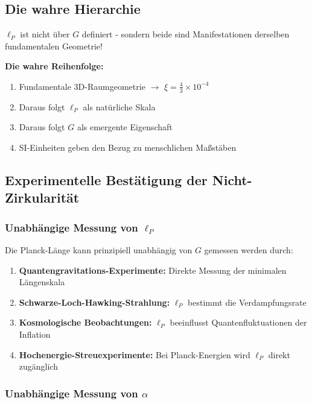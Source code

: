 \documentclass[12pt,a4paper]{article}
\theoremstyle{definition}
\begin{document}
	\subsection{Die wahre Hierarchie}
	
	\begin{tcolorbox}[colback=green!5!white,colframe=green!75!black,title=Korrekte Interpretation]
		$\ell_P$ ist nicht \"uber $G$ definiert - sondern beide sind Manifestationen derselben fundamentalen Geometrie!
		
		\textbf{Die wahre Reihenfolge:}
		\begin{enumerate}
			\item Fundamentale 3D-Raumgeometrie $\rightarrow$ $\xi = \frac{4}{3} \times 10^{-4}$
			\item Daraus folgt $\ell_P$ als nat\"urliche Skala
			\item Daraus folgt $G$ als emergente Eigenschaft  
			\item SI-Einheiten geben den Bezug zu menschlichen Ma\ss{}st\"aben
		\end{enumerate}
	\end{tcolorbox}
	
	\subsection{Experimentelle Best\"atigung der Nicht-Zirkularit\"at}
	
	\subsubsection{Unabh\"angige Messung von $\ell_P$}
	
	Die Planck-L\"ange kann prinzipiell unabh\"angig von $G$ gemessen werden durch:
	
	\begin{enumerate}
		\item \textbf{Quantengravitations-Experimente:} Direkte Messung der minimalen L\"angenskala
		\item \textbf{Schwarze-Loch-Hawking-Strahlung:} $\ell_P$ bestimmt die Verdampfungsrate
		\item \textbf{Kosmologische Beobachtungen:} $\ell_P$ beeinflusst Quantenfluktuationen der Inflation
		\item \textbf{Hochenergie-Streuexperimente:} Bei Planck-Energien wird $\ell_P$ direkt zug\"anglich
	\end{enumerate}
	
	\subsubsection{Unabh\"angige Messung von $\alpha$}
	
\end{document}
